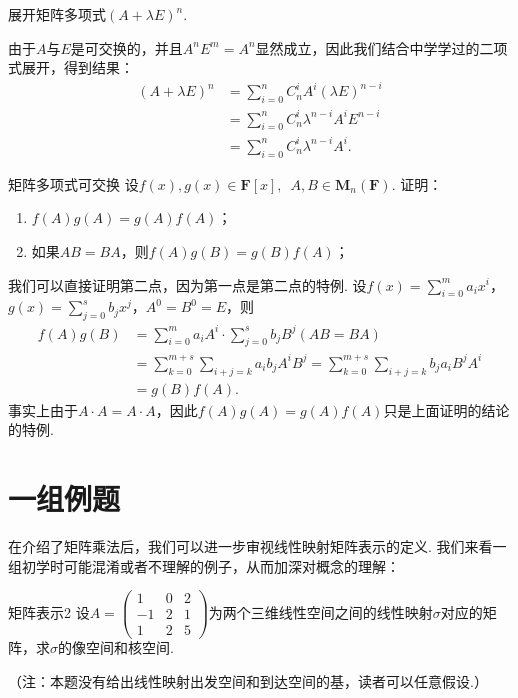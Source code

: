 \begin{example}{}{}
    展开矩阵多项式$(A+\lambda E)^n$.
\end{example}

\begin{solution}
    由于$A$与$E$是可交换的，并且$A^nE^m=A^n$显然成立，因此我们结合中学学过的二项式展开，得到结果：
    \begin{align*}
        (A+\lambda E)^n & =\sum_{i=0}^nC_n^iA^i(\lambda E)^{n-i}    \\
                        & =\sum_{i=0}^nC_n^i\lambda^{n-i}A^iE^{n-i} \\
                        & =\sum_{i=0}^nC_n^i\lambda^{n-i}A^i.
    \end{align*}
\end{solution}

\begin{example}{}{矩阵多项式可交换}
    设$f(x),g(x) \in \mathbf{F}[x],\enspace A,B \in \mathbf{M}_n(\mathbf{F})$. 证明：
    \begin{enumerate}
        \item $f(A)g(A)=g(A)f(A)$；

        \item 如果$AB=BA$，则$f(A)g(B)=g(B)f(A)$；
    \end{enumerate}
\end{example}

\begin{solution}
    我们可以直接证明第二点，因为第一点是第二点的特例. 设$f(x)=\displaystyle\sum_{i=0}^ma_ix^i$，$g(x)=\displaystyle\sum_{j=0}^sb_jx^j$，$A^0=B^0=E$，则
    \begin{align*}
        f(A)g(B) & =\displaystyle\sum_{i=0}^ma_iA^i\cdot \displaystyle\sum_{j=0}^sb_jB^j(AB=BA)                                                           \\
                 & =\displaystyle\sum_{k=0}^{m+s}\displaystyle\sum_{i+j=k}a_ib_jA^iB^j=\displaystyle\sum_{k=0}^{m+s}\displaystyle\sum_{i+j=k}b_ja_iB^jA^i \\
                 & =g(B)f(A).
    \end{align*}
    事实上由于$A\cdot A=A\cdot A$，因此$f(A)g(A)=g(A)f(A)$只是上面证明的结论的特例.
\end{solution}

\section{一组例题}

在介绍了矩阵乘法后，我们可以进一步审视线性映射矩阵表示的定义. 我们来看一组初学时可能混淆或者不理解的例子，从而加深对概念的理解：
\begin{example}{}{矩阵表示2}
    设$A=\begin{pmatrix}1 & 0 & 2 \\ -1 & 2 & 1 \\ 1 & 2 & 5\end{pmatrix}$为两个三维线性空间之间的线性映射$\sigma$对应的矩阵，求$\sigma$的像空间和核空间.
\end{example}
（注：本题没有给出线性映射出发空间和到达空间的基，读者可以任意假设.）

